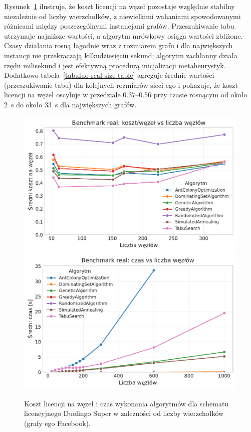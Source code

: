 Rysunek~\ref{fig:duo-real-size} ilustruje, że koszt licencji na węzeł pozostaje względnie stabilny niezależnie od liczby wierzchołków, z niewielkimi wahaniami spowodowanymi różnicami między poszczególnymi instancjami grafów. Przeszukiwanie tabu utrzymuje najniższe wartości, a algorytm mrówkowy osiąga wartości zbliżone. Czasy działania rosną łagodnie wraz z rozmiarem grafu i dla największych instancji nie przekraczają kilkudziesięciu sekund; algorytm zachłanny działa rzędu milisekund i jest efektywną procedurą inicjalizacji metaheurystyk. Dodatkowo tabela~\ref{tab:duo-real-size-table} agreguje średnie wartości (przeszukiwanie tabu) dla kolejnych rozmiarów sieci ego i pokazuje, że koszt licencji na węzeł oscyluje w przedziale 0.37--0.56 przy czasie rosnącym od około 2~s do około 33~s dla największych grafów.

\begin{figure}[H]
  \centering
  \includegraphics[width=0.48\linewidth]{assets/figures/benchmark/real/cost_per_node_vs_nodes.pdf}
  \hfill
  \includegraphics[width=0.48\linewidth]{assets/figures/benchmark/real/time_vs_nodes.pdf}
  \caption{Koszt licencji na węzeł i czas wykonania algorytmów dla schematu licencyjnego Duolingo Super w zależności od liczby wierzchołków (grafy ego Facebook).}
  \label{fig:duo-real-size}
\end{figure}

